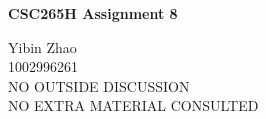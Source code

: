 \documentclass[10pt]{article}
\begin{document}
\begin{center}
{\bf \Large \bf CSC265H Assignment 8}
\end{center}

\noindent
Yibin Zhao\\
1002996261\\
NO OUTSIDE DISCUSSION\\
NO EXTRA MATERIAL CONSULTED\\

\begin{comment}
A black$&$white heap is a singly-linked list of binomial trees that satisfies the
following properties:
	The roots of the binomial trees in the list have strictly increasing
	degrees.
	The root of every binomial tree is white.
	If a white node is not the root of a binomial tree, its priority is greater
	than or equal to the priority of its parent.
	The black nodes all have different degrees.
	The degree od a black node is 1 less than the degree of its parent, i.e.
	the black node is the first child of its parent.

Recal that a node in a binomial heap has degree k if and only if the subtree
rooted at that node is a binomial tree with $2^k$ nodes.

We say that a linked-list of binomial trees is a k-black$&$while heap if it
satisfies all the properties of a black$&$white heap except that it has at
most two black nodes of degree k and at most one of its black nodes of degree k
has a parent of degree greater than $k+1$.
Thus for every natural number k, every black$&$white heap is a k-black$&$white
heap.
\end{comment}
\end{document}
